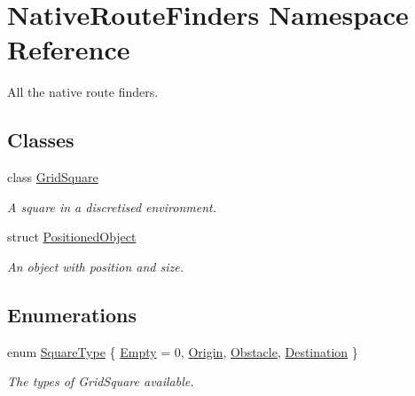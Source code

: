 \hypertarget{namespace_native_route_finders}{\section{Native\-Route\-Finders Namespace Reference}
\label{namespace_native_route_finders}
}


All the native route finders.  


\subsection*{Classes}
\begin{DoxyCompactItemize}
\item 
class \hyperlink{class_native_route_finders_1_1_grid_square}{Grid\-Square}
\begin{DoxyCompactList}\small\item\em A square in a discretised environment. \end{DoxyCompactList}\item 
struct \hyperlink{struct_native_route_finders_1_1_positioned_object}{Positioned\-Object}
\begin{DoxyCompactList}\small\item\em An object with position and size. \end{DoxyCompactList}\end{DoxyCompactItemize}
\subsection*{Enumerations}
\begin{DoxyCompactItemize}
\item 
enum \hyperlink{namespace_native_route_finders_a999338a470482866455cb63c5e932b6a}{Square\-Type} \{ \hyperlink{namespace_native_route_finders_a999338a470482866455cb63c5e932b6aa1d0e7ff82e806a63e7e1c8ee7e77f46c}{Empty} =  0, 
\hyperlink{namespace_native_route_finders_a999338a470482866455cb63c5e932b6aaa3f0fd16f76030be173250e5be02acdf}{Origin}, 
\hyperlink{namespace_native_route_finders_a999338a470482866455cb63c5e932b6aa0fdaf3ee2d70ceee5173cc645c9d0f12}{Obstacle}, 
\hyperlink{namespace_native_route_finders_a999338a470482866455cb63c5e932b6aa39d425db84d33144b7a52e09ee5ff143}{Destination}
 \}
\begin{DoxyCompactList}\small\item\em The types of Grid\-Square available. \end{DoxyCompactList}\end{DoxyCompactItemize}
